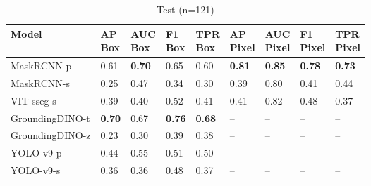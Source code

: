 \begin{table*}[t]
  \hfill %

    \begin{subtable}[b]{\textwidth} %
    \caption{Test (n=121)}
    \centering
        \begin{tabular}{lllllllll}
        \toprule
         Model      & \makecell{AP\\Box}   & \makecell{AUC\\Box}   & \makecell{F1\\Box}   & \makecell{TPR\\Box}   & \makecell{AP\\Pixel}   & \makecell{AUC\\Pixel}   & \makecell{F1\\Pixel}   & \makecell{TPR\\Pixel}     \\
        \midrule
         MaskRCNN-p      & 0.61          & \textbf{0.70} & 0.65          & 0.60          & \textbf{0.81} & \textbf{0.85} & \textbf{0.78} & \textbf{0.73} \\
         MaskRCNN-s      & 0.25          & 0.47          & 0.34          & 0.30          & 0.39          & 0.80          & 0.41          & 0.44          \\
         VIT-sseg-s      & 0.39          & 0.40          & 0.52          & 0.41          & 0.41          & 0.82          & 0.48          & 0.37          \\
         GroundingDINO-t & \textbf{0.70} & 0.67          & \textbf{0.76} & \textbf{0.68} & --            & --            & --            & --            \\
         GroundingDINO-z & 0.23          & 0.30          & 0.39          & 0.38          & --            & --            & --            & --            \\
         YOLO-v9-p       & 0.44          & 0.55          & 0.51          & 0.50          & --            & --            & --            & --            \\
         YOLO-v9-s       & 0.36          & 0.36          & 0.48          & 0.37          & --            & --            & --            & --            \\
        \bottomrule
        \end{tabular}
    \end{subtable}

\end{table*}



